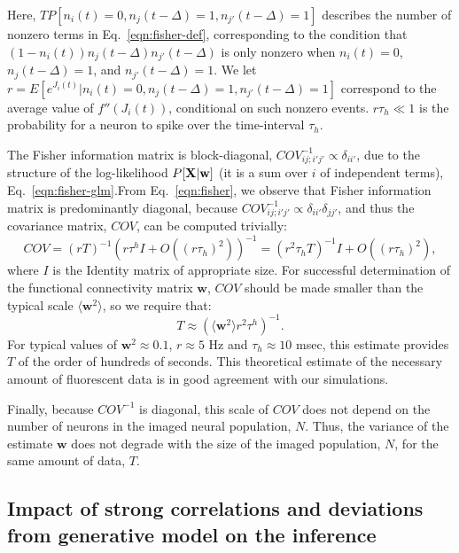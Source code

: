 \documentclass[aoas,preprint]{imsart}
\newcommand{\w}{w}
\newcommand{\bw}{\mathbf{\w}}
\newcommand{\bX}{{\bf X}}
\begin{document}
Here, $TP[n_i(t)=0, n_j(t-\Delta)=1, n_{j'}(t-\Delta)=1]$ describes the number of nonzero
terms in Eq.~\eqref{eqn:fisher-def}, corresponding to the condition that
$(1-n_i(t))n_{j}(t-\Delta)n_{j'}(t-\Delta)$ is only nonzero when 
$n_i(t)=0$, $n_j(t-\Delta)=1$, and $n_{j'}(t-\Delta)=1$.  We let $r=E[e^{J_i(t)}|n_i(t)=0, n_j(t-\Delta)=1, n_{j'}(t-\Delta)=1]$  correspond to the average value of $f''(J_i(t))$, conditional on such nonzero events.  $r\tau_h \ll 1$ is the probability for a neuron to spike over the time-interval $\tau_h$.

The Fisher information matrix is block-diagonal, $COV^{-1}_{ij;i'j'} \propto \delta_{ii'}$, due to the structure of the log-likelihood $P[\bX | \bw]$ (it is a sum over $i$ of independent terms), Eq.~\eqref{eqn:fisher-glm}.From Eq.~\eqref{eqn:fisher}, we observe that Fisher information matrix is predominantly diagonal, because $COV^{-1}_{ij;i'j'} \propto \delta_{ii'}\delta_{jj'}$, and thus the covariance matrix, $COV$, can be computed trivially:
\begin{equation}
COV = (rT)^{-1} (r \tau^h I + O((r \tau_h)^2))^{-1} = (r^2 \tau_h T)^{-1} I + O((r \tau_h)^2),
\end{equation}
\noindent where $I$ is the Identity matrix of appropriate size.  For successful determination of the functional connectivity matrix $\bw$, $COV$ should be made smaller than the typical scale $\langle \bw^2\rangle$, so we require that:
\begin{equation}
T \approx (\langle \bw^2 \rangle r^2  \tau^h)^{-1}.
\end{equation}
For typical values of $\bw^2\approx 0.1$, $r\approx 5$ Hz and $ \tau_h \approx 10$ msec, this estimate provides $T$ of the order of hundreds of seconds. This theoretical estimate of the necessary amount of fluorescent data is in good agreement with our simulations.

Finally, because $COV^{-1}$ is diagonal, this scale of $COV$ does not depend on the number of neurons in the imaged neural population, $N$. Thus, the variance of the estimate $\bw$ does not degrade with the size of the imaged population, $N$, for the same amount of data, $T$.

\subsection{Impact of strong correlations and deviations from generative model on the inference}
\end{document}
